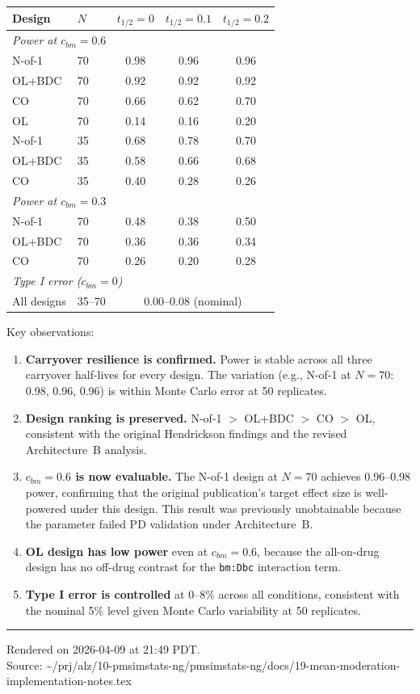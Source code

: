 \documentclass[11pt]{article}
\begin{document}
\begin{center}
\begin{tabular}{llccc}
\toprule
\textbf{Design} & $N$ & $t_{1/2} = 0$ & $t_{1/2} = 0.1$
  & $t_{1/2} = 0.2$ \\
\midrule
\multicolumn{5}{l}{\textit{Power at $c_{bm} = 0.6$}} \\
N-of-1 & 70 & 0.98 & 0.96 & 0.96 \\
OL+BDC & 70 & 0.92 & 0.92 & 0.92 \\
CO     & 70 & 0.66 & 0.62 & 0.70 \\
OL     & 70 & 0.14 & 0.16 & 0.20 \\
N-of-1 & 35 & 0.68 & 0.78 & 0.70 \\
OL+BDC & 35 & 0.58 & 0.66 & 0.68 \\
CO     & 35 & 0.40 & 0.28 & 0.26 \\
\midrule
\multicolumn{5}{l}{\textit{Power at $c_{bm} = 0.3$}} \\
N-of-1 & 70 & 0.48 & 0.38 & 0.50 \\
OL+BDC & 70 & 0.36 & 0.36 & 0.34 \\
CO     & 70 & 0.26 & 0.20 & 0.28 \\
\midrule
\multicolumn{5}{l}{\textit{Type I error ($c_{bm} = 0$)}} \\
All designs & 35--70 & \multicolumn{3}{c}{0.00--0.08
  (nominal)} \\
\bottomrule
\end{tabular}
\end{center}

Key observations:

\begin{enumerate}[leftmargin=2em]

\item \textbf{Carryover resilience is confirmed.} Power is
  stable across all three carryover half-lives for every
  design. The variation (e.g., N-of-1 at $N = 70$: 0.98,
  0.96, 0.96) is within Monte Carlo error at 50 replicates.

\item \textbf{Design ranking is preserved.} N-of-1 $>$
  OL+BDC $>$ CO $>$ OL, consistent with the original
  Hendrickson findings and the revised Architecture~B
  analysis.

\item \textbf{$c_{bm} = 0.6$ is now evaluable.} The N-of-1
  design at $N = 70$ achieves 0.96--0.98 power, confirming
  that the original publication's target effect size is
  well-powered under this design. This result was previously
  unobtainable because the parameter failed PD validation
  under Architecture~B.

\item \textbf{OL design has low power} even at $c_{bm} =
  0.6$, because the all-on-drug design has no off-drug
  contrast for the \texttt{bm:Dbc} interaction term.

\item \textbf{Type I error is controlled} at 0--8\%
  across all conditions, consistent with the nominal 5\%
  level given Monte Carlo variability at 50 replicates.

\end{enumerate}

\vfill

\noindent\rule{\textwidth}{0.4pt}

{\footnotesize
Rendered on 2026-04-09 at 21:49 PDT.\\
Source: \textasciitilde/prj/alz/10-pmsimstats-ng/pmsimstats-ng/docs/19-mean-moderation-implementation-notes.tex}
\end{document}
